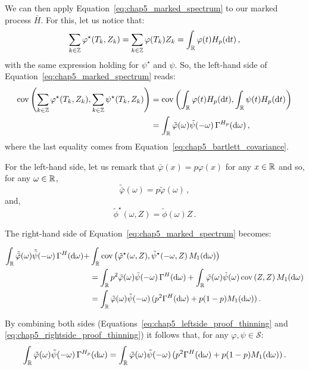 \begin{subappendices}
        We can then apply Equation~\eqref{eq:chap5_marked_spectrum} to our marked process $\bar H$. 
        For this, let us notice that:
        \[
            \sum_{k\in{\mathbb Z}}{\varphi^\star(T_k, Z_k)} = \sum_{k\in{\mathbb Z}}{\varphi(T_k)Z_k} = \int_{{\mathbb R}}{\varphi(t) H_p({\mathrm{d}} t)}\,,
        \]
        with the same expression holding for $\psi^\star$ and $\psi$. 
        So, the left-hand side of Equation~\eqref{eq:chap5_marked_spectrum} reads:
        \begin{align}
            \operatorname{cov}\left(\sum_{k\in{\mathbb Z}}{\varphi^\star(T_k, Z_k)}, \sum_{k\in{\mathbb Z}}{\psi^\star(T_k, Z_k)}\right) &=
            \operatorname{cov}\left(\int_{{\mathbb R}}{\varphi(t) H_p({\mathrm{d}} t)}, \int_{{\mathbb R}}{\psi(t) H_p({\mathrm{d}} t)}\right) \nonumber\\
            &= \int_{{\mathbb R}}{\tilde \varphi(\omega)\tilde \psi(-\omega)\,\Gamma^{H_p}({\mathrm{d}}\omega)}\,,\label{eq:chap5_leftside_proof_thinning}
        \end{align}
        where the last equality comes from Equation~\eqref{eq:chap5_bartlett_covariance}.

        For the left-hand side, let us remark that $\bar \varphi(x) = p \varphi(x)$ for any $x\in{\mathbb R}$ and so, for any $\omega\in{\mathbb R}$,
        \[
            \tilde {\bar \varphi}(\omega) = p \tilde \varphi(\omega)\,,
        \]
        and,
        \[\tilde \phi^\star(\omega, Z) = \tilde \phi(\omega)Z\,.\]

        The right-hand side of Equation~\eqref{eq:chap5_marked_spectrum} becomes:

        \begin{align}
            \int_{{\mathbb R}}{\tilde {\bar\varphi} (\omega) \tilde{\bar \psi} (-\omega)\,\Gamma^H({\mathrm{d}} \omega)} 
        + &\int_{{\mathbb R}}{\operatorname{cov}\left( \tilde \varphi^\star(\omega, Z), \tilde \psi^\star (-\omega, Z)\,M_1({\mathrm{d}} \omega)\right)} \nonumber\\
        &= \int_{{\mathbb R}}{p^2 \tilde {\varphi} (\omega) \tilde{\psi} (-\omega)\,\Gamma^H({\mathrm{d}} \omega)} 
        + \int_{{\mathbb R}}{\tilde \varphi(\omega)\tilde \psi(\omega) \operatorname{cov}\left(Z,Z\right)M_1({\mathrm{d}} \omega)} \nonumber\\
        &= \int_{{\mathbb R}}{\tilde {\varphi} (\omega) \tilde{\psi} (-\omega)\,(p^2\Gamma^H({\mathrm{d}} \omega) + p(1-p) M_1({\mathrm{d}} \omega))}\,.\label{eq:chap5_rightside_proof_thinning}
        \end{align}

        By combining both sides (Equations~\eqref{eq:chap5_leftside_proof_thinning} and \eqref{eq:chap5_rightside_proof_thinning}) it follows that,
        for any $\varphi, \psi\in\mathcal{S}$:
        \[
            \int_{{\mathbb R}}{\tilde \varphi(\omega)\tilde \psi(-\omega)\,\Gamma^{H_p}({\mathrm{d}}\omega)} = \int_{{\mathbb R}}{\tilde {\varphi} (\omega) \tilde{\psi} (-\omega)\,(p^2\Gamma^H({\mathrm{d}} \omega) + p(1-p) M_1({\mathrm{d}} \omega))}\,.
        \]
        

\end{subappendices}
